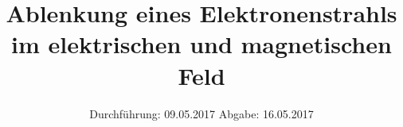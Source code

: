 

\subject{V501}
\title{Ablenkung eines Elektronenstrahls im elektrischen und magnetischen Feld}
\date{
\centering
  Durchführung: 09.05.2017
  \hspace{3em}
  Abgabe: 16.05.2017
}



\maketitle
\thispagestyle{empty}
\tableofcontents
\newpage








\printbibliography


